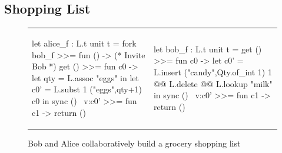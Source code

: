 \subsection{Shopping List}

\begin{figure}
\centering
\begin{tabular}{l||l}
\begin{ocaml}
let alice_f : L.t unit t =
  fork bob_f >>= fun () -> (* Invite Bob *)
  get () >>= fun c0 ->
  let qty = L.assoc "eggs" in
  let c0' = L.subst 1 ("eggs",qty+1) c0 in
  sync () ~v:c0' >>=
  fun c1 -> return ()
\end{ocaml}
&
\begin{ocaml}
let bob_f : L.t unit t =
  get () >>= fun c0 ->
  let c0' = L.insert ("candy",Qty.of_int 1) 1 @@
            L.delete @@ L.lookup "milk" in
  sync () ~v:c0' >>=
  fun c1 -> return ()
\end{ocaml}
\\
\end{tabular}
\caption{Bob and Alice collaboratively build a grocery shopping list}
\label{fig:shopping-list-code}
\end{figure}

